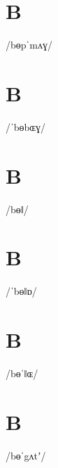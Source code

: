 \documentclass[10pt,a4paper,twoside]{book}
\begin{document}
\section*{B}

\begin{multicols}{3}
 {/bɵpˈmʌɣ/} {}
\end{multicols}

\section*{B}

\begin{multicols}{3}
 {/ˈbɵbɶɣ/} {}
\end{multicols}

\section*{B}

\begin{multicols}{3}
 {/bɵǁ/} {}
\end{multicols}

\section*{B}

\begin{multicols}{3}
 {/ˈbɵǁɒ/} {}
\end{multicols}

\section*{B}

\begin{multicols}{3}
 {/bɵˈǁɶ/} {}
\end{multicols}

\section*{B}

\begin{multicols}{3}
 {/bɵˈgʌtʼ/} {}
\end{multicols}
\end{document}
